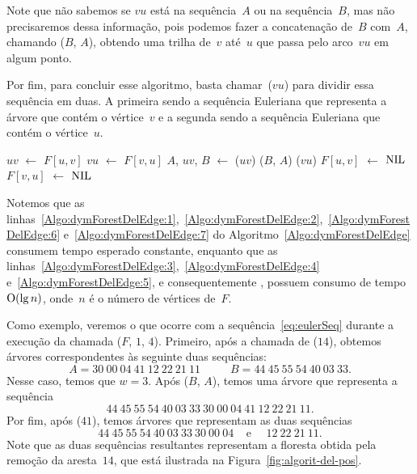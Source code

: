 Note que não sabemos se $vu$ está na sequência~$A$ ou na sequência~$B$, mas não precisaremos dessa informação, pois podemos fazer a concatenação de~$B$ com~$A$,
chamando \treapJoin($B$, $A$), obtendo uma trilha de~$v$ até~$u$ que passa pelo arco~$vu$ em algum ponto.

Por fim, para concluir esse algoritmo, basta chamar~\treapSplit($vu$) para dividir essa sequência em duas.
A primeira sendo a sequência Euleriana que representa a árvore que contém o vértice~$v$ e a segunda sendo a sequência Euleriana que contém o vértice~$u$.

\begin{algorithm}[htb]
\caption{\dymForestDelEdge($F$, $u$, $v$)}
\label{Algo:dymForestDelEdge}
\begin{algorithmic}[1]
\State $uv$ $\gets$ $F[u,v]$\label{Algo:dymForestDelEdge:1}
\State $vu$ $\gets$ $F[v,u]$\label{Algo:dymForestDelEdge:2}
\State $A$, $uv$, $B$ $\gets$ \treapSplit($uv$)\label{Algo:dymForestDelEdge:3}
\State \treapJoin($B$, $A$)\label{Algo:dymForestDelEdge:4}
\State \treapSplit($vu$)\label{Algo:dymForestDelEdge:5}
\State $F[u,v]$ $\gets$ $\text{NIL}{}$\label{Algo:dymForestDelEdge:6}
\State $F[v,u]$ $\gets$ $\text{NIL}{}$\label{Algo:dymForestDelEdge:7}
\end{algorithmic}
\end{algorithm}

Notemos que as linhas~\ref{Algo:dymForestDelEdge:1},~\ref{Algo:dymForestDelEdge:2},~\ref{Algo:dymForestDelEdge:6} e~\ref{Algo:dymForestDelEdge:7} do Algoritmo~\ref{Algo:dymForestDelEdge} consumem tempo esperado constante, enquanto que as linhas~\ref{Algo:dymForestDelEdge:3},~\ref{Algo:dymForestDelEdge:4} e~\ref{Algo:dymForestDelEdge:5}, e consequentemente \dymForestDelEdge{}, possuem consumo de tempo~$\mathrm{O}(\lg n)$, onde~$n$ é o número de vértices de~$F$.

Como exemplo, veremos o que ocorre com a sequência~\eqref{eq:eulerSeq} durante a execução da chamada \dymForestDelEdge($F$, $1$, $4$).
Primeiro, após a chamada de \treapSplit($14$), obtemos árvores correspondentes às seguinte duas sequências:
\begin{equation}
A = 30~00~04~41~12~22~21~11~~~~~~~~~~~~B = 44~45~55~54~40~03~33.\nonumber
\end{equation}
Nesse caso, temos que $w=3$. Após \treapJoin($B$, $A$), temos uma árvore que representa a sequência
\begin{equation}
 44~45~55~54~40~03~33~30~00~04~41~12~22~21~11.\nonumber
\end{equation}
Por fim, após \treapSplit($41$), temos árvores que representam as duas sequências
\begin{equation}
 44~45~55~54~40~03~33~30~00~04~~~~~\text{e}~~~~~~12~22~21~11.\label{eq:apos-remocao}
\end{equation}
Note que as duas sequências resultantes representam a floresta obtida pela remoção da aresta~$14$, que está ilustrada na Figura~\ref{fig:algorit-del-pos}.

